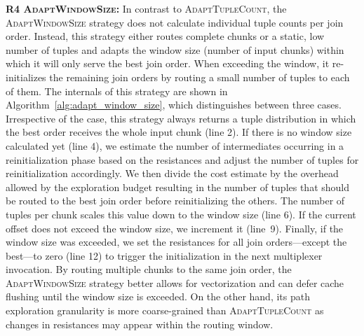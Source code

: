 \textbf{R4 \textsc{AdaptWindowSize}:} In contrast to \textsc{AdaptTupleCount}, the \textsc{AdaptWindowSize} strategy does not calculate individual tuple counts per join order. Instead, this strategy either routes complete chunks or a static, low number of tuples and adapts the window size (\ie number of input chunks) within which it will only serve the best join order. When exceeding the window, it re-initializes the remaining join orders by routing a small number of tuples to each of them. The internals of this strategy are shown in Algorithm~\ref{alg:adapt_window_size}, which distinguishes between three cases. Irrespective of the case, this strategy always returns a tuple distribution in which the best order receives the whole input chunk (line 2). If there is no window size calculated yet (line 4), we estimate the number of intermediates occurring in a reinitialization phase based on the resistances and adjust the number of tuples for reinitialization accordingly. We then divide the cost estimate by the overhead allowed by the exploration budget resulting in the number of tuples that should be routed to the best join order before reinitializing the others. The number of tuples per chunk scales this value down to the window size (line 6). If the current offset does not exceed the window size, we increment it (line~9). Finally, if the window size was exceeded, we set the resistances for all join orders---except the best---to zero (line 12) to trigger the initialization in the next multiplexer invocation. By routing multiple chunks to the same join order, the \textsc{AdaptWindowSize} strategy better allows for vectorization and can defer cache flushing until the window size is exceeded. On the other hand, its path exploration granularity is more coarse-grained than \textsc{AdaptTupleCount} as changes in resistances may appear within the routing window.

